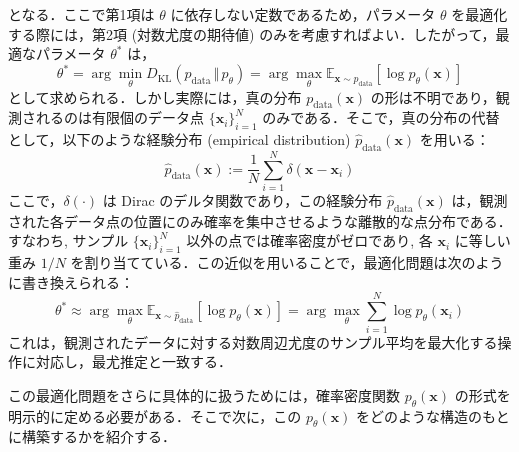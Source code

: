 \documentclass[titlepage]{ltjsbook}
\begin{document}
となる．ここで第1項は $\theta$ に依存しない定数であるため，パラメータ $\theta$ を最適化する際には，第2項 (対数尤度の期待値) のみを考慮すればよい．したがって，最適なパラメータ $\theta^*$ は，
\begin{equation}
\theta^* = \arg\min_\theta D_{\mathrm{KL}}\left(p_{\mathrm{data}} \,\Vert\, p_\theta\right)
= \arg\max_\theta \mathbb{E}_{\mathbf{x} \sim p_{\mathrm{data}}} \left[ \log p_\theta(\mathbf{x}) \right]
\end{equation}
として求められる．しかし実際には，真の分布 $p_{\mathrm{data}}(\mathbf{x})$ の形は不明であり，観測されるのは有限個のデータ点 $\{\mathbf{x}_i\}_{i=1}^N$ のみである．そこで，真の分布の代替として，以下のような経験分布 (empirical distribution) $\hat{p}_{\mathrm{data}}(\mathbf{x})$ を用いる：
\begin{equation}
\hat{p}_{\mathrm{data}}(\mathbf{x}) := \frac{1}{N} \sum_{i=1}^N \delta(\mathbf{x} - \mathbf{x}_i)
\end{equation}
ここで，$\delta(\cdot)$ は Dirac のデルタ関数であり，この経験分布 $\hat{p}_{\mathrm{data}}(\mathbf{x})$ は，観測された各データ点の位置にのみ確率を集中させるような離散的な点分布である．すなわち, サンプル $\{\mathbf{x}_i\}_{i=1}^N$ 以外の点では確率密度がゼロであり, 各 $\mathbf{x}_i$ に等しい重み $1/N$ を割り当てている．この近似を用いることで，最適化問題は次のように書き換えられる：
\begin{equation}
\theta^* \approx \arg\max_\theta \mathbb{E}_{\mathbf{x} \sim \hat{p}_{\mathrm{data}}} \left[ \log p_\theta(\mathbf{x}) \right]
= \arg\max_\theta \sum_{i=1}^N \log p_\theta(\mathbf{x}_i)
\end{equation}
これは，観測されたデータに対する対数周辺尤度のサンプル平均を最大化する操作に対応し，最尤推定と一致する．

この最適化問題をさらに具体的に扱うためには，確率密度関数 $p_\theta(\mathbf{x})$ の形式を明示的に定める必要がある．そこで次に，この $p_\theta(\mathbf{x})$ をどのような構造のもとに構築するかを紹介する．

\printbibliography[segment=\therefsegment,heading=subbibliography,title={参考文献}]
\end{document}
